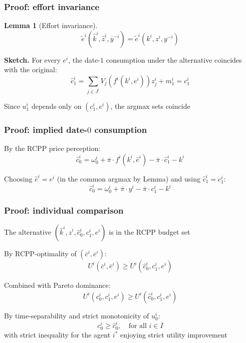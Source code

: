 \documentclass[blue]{beamer}
\def\geq{\geqslant}
\theoremstyle{definition}
\theoremstyle{example}
\newtheorem*{lemmans}{Lemma}
\begin{document}
\begin{frame}\frametitle{Proof: effort invariance}
\begin{lemmans}[Effort invariance]
\begin{equation*}
\widetilde{e}^i(\widehat{k}^i, \widehat{z}^i, \overline{y}^{-i}) = \widetilde{e}^i(k^i, z^i, y^{-i})
\end{equation*}
\end{lemmans}
\bigskip

\textbf{Sketch.} For every $e^i$, the date-$1$ consumption under the alternative coincides with the original:
\begin{equation*}
\widehat{c}^i_1 = \sum_{j \in J^i} V_j(f^i(k^i, e^i)) z^i_j + m^i_1 = c^i_1
\end{equation*}
\bigskip

Since $u^i_1$ depends only on $(c^i_1, e^i)$, the argmax sets coincide
\end{frame}

\begin{frame}\frametitle{Proof: implied date-$0$ consumption}
By the RCPP price perception:
\begin{equation*}
\widehat{c}^i_0 = \omega^i_0 + \overline{\pi} \cdot f^i(k^i, \widehat{e}^i) - \overline{\pi} \cdot \widehat{c}^i_1 - k^i
\end{equation*}
\bigskip

Choosing $\widehat{e}^i = e^i$ (in the common argmax by Lemma) and using $\widehat{c}^i_1 = c^i_1$:
\begin{equation*}
\widehat{c}^i_0 = \omega^i_0 + \overline{\pi} \cdot y^i - \overline{\pi} \cdot c^i_1 - k^i
\end{equation*}
\end{frame}

\begin{frame}\frametitle{Proof: individual comparison}
The alternative $(\widehat{k}^i, \widehat{z}^i, \widehat{c}^i_0, c^i_1, e^i)$ is in the RCPP budget set
\bigskip

By RCPP-optimality of $(\overline{c}^i, \overline{e}^i)$:
\begin{equation*}
U^i(\overline{c}^i, \overline{e}^i) \geq U^i(\widehat{c}^i_0, c^i_1, e^i)
\end{equation*}
\bigskip

Combined with Pareto dominance:
\begin{equation*}
U^i(c^i_0, c^i_1, e^i) \geq U^i(\widehat{c}^i_0, c^i_1, e^i)
\end{equation*}
\bigskip

By time-separability and strict monotonicity of $u^i_0$:
\begin{equation*}
c^i_0 \geq \widehat{c}^i_0, \quad \text{for all $i \in I$}
\end{equation*}
with strict inequality for the agent $i^\ast$ enjoying strict utility improvement
\end{frame}
\end{document}
